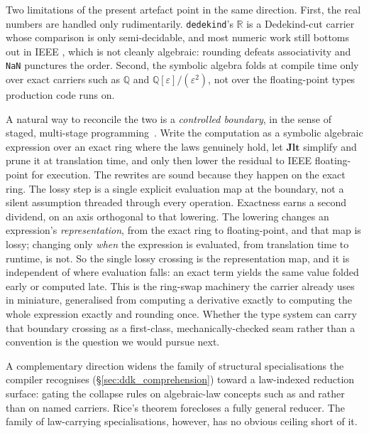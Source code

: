 \documentclass[11pt, a4paper]{article}
\begin{document}
Two limitations of the present artefact point in the same direction.
First, the real numbers are handled only rudimentarily.
\texttt{dedekind}'s $\mathbb{R}$ is a Dedekind-cut carrier whose comparison is only semi-decidable, and most numeric work still bottoms out in IEEE , which is not cleanly algebraic: rounding defeats associativity and \texttt{NaN} punctures the order.
Second, the symbolic algebra folds at compile time only over exact carriers such as $\mathbb{Q}$ and $\mathbb{Q}[\varepsilon]/(\varepsilon^2)$, not over the floating-point types production code runs on.

A natural way to reconcile the two is a \emph{controlled boundary}, in the sense of staged, multi-stage programming~\cite{taha2000metaml}.
Write the computation as a symbolic algebraic expression over an exact ring where the laws genuinely hold, let $\mathbf{Jlt}$ simplify and prune it at translation time, and only then lower the residual to IEEE floating-point for execution.
The rewrites are sound because they happen on the exact ring.
The lossy step is a single explicit evaluation map at the boundary, not a silent assumption threaded through every operation.
Exactness earns a second dividend, on an axis orthogonal to that lowering.
The lowering changes an expression's \emph{representation}, from the exact ring to floating-point, and that map is lossy; changing only \emph{when} the expression is evaluated, from translation time to runtime, is not.
So the single lossy crossing is the representation map, and it is independent of where evaluation falls: an exact term yields the same value folded early or computed late.
This is the ring-swap machinery the  carrier already uses in miniature, generalised from computing a derivative exactly to computing the whole expression exactly and rounding once.
Whether the type system can carry that boundary crossing as a first-class, mechanically-checked seam rather than a convention is the question we would pursue next.

A complementary direction widens the family of structural specialisations the compiler recognises (§\ref{sec:ddk_comprehension}) toward a law-indexed reduction surface: gating the collapse rules on algebraic-law concepts such as  and  rather than on named carriers.
Rice's theorem forecloses a fully general reducer.
The family of law-carrying specialisations, however, has no obvious ceiling short of it.

\printbibliography
\end{document}
